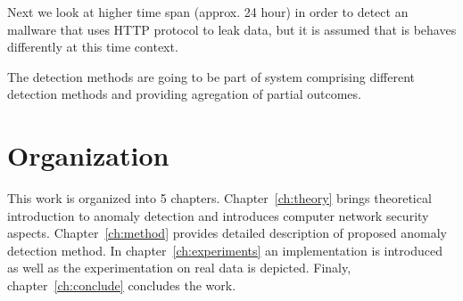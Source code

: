 Next we look at higher time span (approx. 24 hour) in order to detect an mallware that uses HTTP protocol to leak data, but it is 
assumed that is behaves differently at this time context. 

The detection methods are going to be part of system comprising different detection methods and providing agregation of partial outcomes.

\section{Organization}

This work is organized into 5 chapters. Chapter~\ref{ch:theory} brings theoretical introduction to anomaly detection and 
introduces computer network security aspects. Chapter~\ref{ch:method} provides detailed description of proposed
anomaly detection method. In chapter~\ref{ch:experiments} an implementation is introduced as well as the experimentation on
real data is depicted. Finaly, chapter~\ref{ch:conclude} concludes the work.
